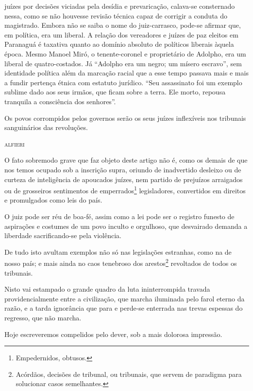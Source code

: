 \begin{didascalia}
{juízes por decisões viciadas pela desídia e prevaricação, calava-se
consternado nessa, como se não houvesse revisão técnica capaz de
corrigir a conduta do magistrado. Embora não se saiba o nome do
juiz-carrasco, pode-se afirmar que, em política, era um liberal. A
relação dos vereadores e juízes de paz eleitos em Paranaguá é taxativa
quanto ao domínio absoluto de políticos liberais àquela época. Mesmo
Manoel Miró, o tenente-coronel e proprietário de Adolpho, era um liberal
de quatro-costados. Já ``Adolpho era um negro; um mísero escravo'', sem
identidade política além da marcação racial que a esse tempo passava
mais e mais a fundir pertença étnica com estatuto jurídico. ``Seu
assassinato foi um exemplo sublime dado aos seus irmãos, que ficam sobre
a terra. Ele morto, repousa tranquila a consciência dos senhores''.}
\end{didascalia}



\epigraph{Os povos corrompidos pelos governos serão os seus juízes inflexíveis nos
tribunais sanguinários das revoluções.}{\textsc{alfieri}\footnotemark}


O fato sobremodo grave que faz objeto deste artigo não é, como os demais
de que nos temos ocupado sob a inscrição supra, oriundo de inadvertido
desleixo ou de curteza de inteligência de apoucados juízes, nem partido
de prejuízos arraigados ou de grosseiros sentimentos de
emperrados\footnote{Empedernidos, obtusos.} legisladores, convertidos
em direitos e promulgados como leis do país.

O juiz pode ser réu de boa-fé, assim como a lei pode ser o registro
funesto de aspirações e costumes de um povo inculto e orgulhoso, que
desvairado demanda a liberdade sacrificando-se pela violência.

De tudo isto avultam exemplos não só nas legislações estranhas, como na
de nosso país; e mais ainda no caos tenebroso dos arestos\footnote{
  Acórdãos, decisões de tribunal, ou tribunais, que servem de paradigma
  para solucionar casos semelhantes.} revoltados de todos os tribunais.

Nisto vai estampado o grande quadro da luta ininterrompida travada
providencialmente entre a civilização, que marcha iluminada pelo farol
eterno da razão, e a tarda ignorância que para e perde-se enterrada nas
trevas espessas do regresso, que não marcha.

Hoje escreveremos compelidos pelo dever, sob a mais dolorosa impressão.

